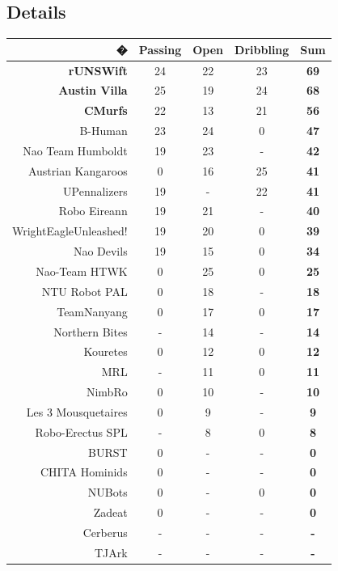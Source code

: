 \documentclass[pdftex,11pt,a4paper]{report}
\begin{document}
\subsection*{Details}
\begin{center}
   \begin{tabular}{rcccc}
      � &Passing &Open &Dribbling &\textbf{Sum} \\
      \hline
      \textbf{rUNSWift} &24 &22 &23 &\textbf{69} \\
      \textbf{Austin Villa} &25 &19 &24 &\textbf{68} \\
      \textbf{CMurfs} &22 &13 &21 &\textbf{56} \\
      B-Human  &23 &24 &0 &\textbf{47} \\
      Nao Team Humboldt  &19 &23 &- &\textbf{42} \\
      Austrian Kangaroos  &0 &16 &25 &\textbf{41} \\
      UPennalizers &19 &- &22 &\textbf{41} \\
      Robo Eireann  &19 &21 &- &\textbf{40} \\
      WrightEagleUnleashed! &19 &20 &0 &\textbf{39} \\
      Nao Devils  &19 &15 &0 &\textbf{34} \\
      Nao-Team HTWK  &0 &25 &0 &\textbf{25} \\
      NTU Robot PAL  &0 &18 &- &\textbf{18} \\
      TeamNanyang &0 &17 &0 &\textbf{17} \\
      Northern Bites  &- &14 &- &\textbf{14} \\
      Kouretes  &0 &12 &0 &\textbf{12} \\
      MRL  &- &11 &0 &\textbf{11} \\
      NimbRo &0 &10 &- &\textbf{10} \\
      Les 3 Mousquetaires  &0 &9 &- &\textbf{9} \\
      Robo-Erectus SPL  &- &8 &0 &\textbf{8}\\
      BURST  &0 &- &- &\textbf{0} \\
      CHITA Hominids  &0 &- &- &\textbf{0} \\
      NUBots  &0 &- &0 &\textbf{0} \\
      Zadeat &0 &- &- &\textbf{0} \\
      Cerberus  &- &- &- &\textbf{-} \\
      TJArk &- &- &- &\textbf{-}
   \end{tabular}
\end{center}
\end{document}
